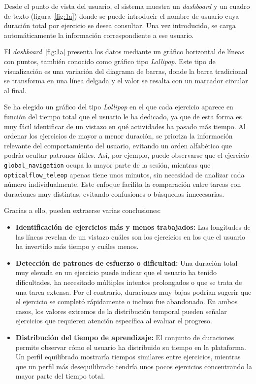 \documentclass[a4paper, 12pt]{book}
\begin{document}
Desde el punto de vista del usuario, el sistema muestra un \textit{dashboard} y un cuadro de texto (figura~\ref{fig:1a}) donde se puede introducir el nombre de usuario cuya duración total por ejercicio se desea consultar. Una vez introducido, se carga automáticamente la información correspondiente a ese usuario.

El \textit{dashboard}~\ref{fig:1a} presenta los datos mediante un gráfico horizontal de líneas con puntos, también conocido como gráfico tipo \textit{Lollipop}. Este tipo de visualización es una variación del diagrama de barras, donde la barra tradicional se transforma en una línea delgada y el valor se resalta con un marcador circular al final.

Se ha elegido un gráfico del tipo \textit{Lollipop} en el que cada ejercicio aparece en función del tiempo total que el usuario le ha dedicado, ya que de esta forma es muy fácil identificar de un vistazo en qué actividades ha pasado más tiempo. Al ordenar los ejercicios de mayor a menor duración, se prioriza la información relevante del comportamiento del usuario, evitando un orden alfabético que podría ocultar patrones útiles. Así, por ejemplo, puede observarse que el ejercicio \texttt{global\_navigation} ocupa la mayor parte de la sesión, mientras que \texttt{opticalflow\_teleop} apenas tiene unos minutos, sin necesidad de analizar cada número individualmente. Este enfoque facilita la comparación entre tareas con duraciones muy distintas, evitando confusiones o búsquedas innecesarias.

Gracias a ello, pueden extraerse varias conclusiones:

\begin{itemize}
  \item \textbf{Identificación de ejercicios más y menos trabajados:} Las longitudes de las líneas revelan de un vistazo cuáles son los ejercicios en los que el usuario ha invertido más tiempo y cuáles menos.

  \item \textbf{Detección de patrones de esfuerzo o dificultad:} Una duración total muy elevada en un ejercicio puede indicar que el usuario ha tenido dificultades, ha necesitado múltiples intentos prolongados o que se trata de una tarea extensa. Por el contrario, duraciones muy bajas podrían sugerir que el ejercicio se completó rápidamente o incluso fue abandonado. En ambos casos, los valores extremos de la distribución temporal pueden señalar ejercicios que requieren atención específica al evaluar el progreso.

  \item \textbf{Distribución del tiempo de aprendizaje:} El conjunto de duraciones permite observar cómo el usuario ha distribuido su tiempo en la plataforma. Un perfil equilibrado mostraría tiempos similares entre ejercicios, mientras que un perfil más desequilibrado tendría unos pocos ejercicios concentrando la mayor parte del tiempo total.
\end{itemize}
\end{document}
